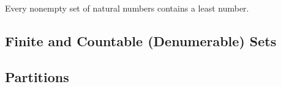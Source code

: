 \begin{Them}
    Every nonempty set of natural numbers contains a least number. 
\end{Them}


\subsection{Finite and Countable (Denumerable) Sets}

\subsection{Partitions}